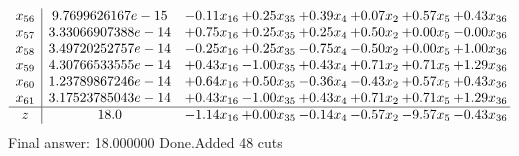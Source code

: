 \documentclass[8pt]{article}
\begin{document}
\[\begin{array}{c| c c@{\hskip 2pt} c@{\hskip 2pt} c@{\hskip 2pt} c@{\hskip 2pt} c@{\hskip 2pt} c@{\hskip 2pt} }
 x_{56}   &  9.7699626167e-15 & -0.11 x_{16} & +  0.25 x_{35} & +  0.39 x_{4} & +  0.07 x_{2} & +  0.57 x_{5} & +  0.43 x_{36}\\
 x_{57}   &  3.33066907388e-14 & +  0.75 x_{16} & +  0.25 x_{35} & +  0.25 x_{4} & +  0.50 x_{2} & +  0.00 x_{5} & -0.00 x_{36}\\
 x_{58}   &  3.49720252757e-14 & -0.25 x_{16} & +  0.25 x_{35} & -0.75 x_{4} & -0.50 x_{2} & +  0.00 x_{5} & +  1.00 x_{36}\\
 x_{59}   &  4.30766533555e-14 & +  0.43 x_{16} & -1.00 x_{35} & +  0.43 x_{4} & +  0.71 x_{2} & +  0.71 x_{5} & +  1.29 x_{36}\\
 x_{60}   &  1.23789867246e-14 & +  0.64 x_{16} & +  0.50 x_{35} & -0.36 x_{4} & -0.43 x_{2} & +  0.57 x_{5} & +  0.43 x_{36}\\
 x_{61}   &  3.17523785043e-14 & +  0.43 x_{16} & -1.00 x_{35} & +  0.43 x_{4} & +  0.71 x_{2} & +  0.71 x_{5} & +  1.29 x_{36}\\
\hline
z    &  18.0 & -1.14 x_{16} & +  0.00 x_{35} & -0.14 x_{4} & -0.57 x_{2} & -9.57 x_{5} & -0.43 x_{36}\\
\end{array}\]
 Final answer: 18.000000 
Done.Added 48 cuts 
\end{document}
